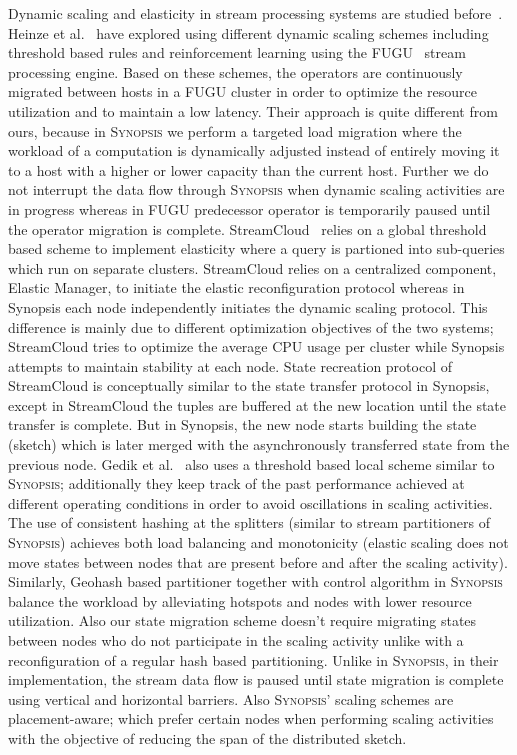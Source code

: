 Dynamic scaling and elasticity in stream processing systems are studied before~\cite{heinze2014auto, gulisano2012streamcloud, castro2013integrating, loesing2012stormy, heinze2013elastic, schneider2009elastic}.
Heinze et al.~\cite{heinze2014auto} have explored using different dynamic scaling schemes including threshold based rules and reinforcement learning using the FUGU~\cite{heinze2013elastic} stream processing engine.
Based on these schemes, the operators are continuously migrated between hosts in a FUGU cluster in order to optimize the resource utilization and to maintain a low latency.
Their approach is quite different from ours, because in \textsc{Synopsis} we perform a targeted load migration where the workload of a computation is dynamically adjusted instead of entirely moving it to a host with a higher or lower capacity than the current host.
Further we do not interrupt the data flow through \textsc{Synopsis} when dynamic scaling activities are in progress whereas in FUGU predecessor operator is temporarily paused until the operator migration is complete. 
StreamCloud~\cite{gulisano2012streamcloud} relies on a global threshold based scheme to implement elasticity where a query is partioned into sub-queries which run on separate clusters.
StreamCloud relies on a centralized component, Elastic Manager, to initiate the elastic reconfiguration protocol whereas in Synopsis each node independently initiates the dynamic scaling protocol.
This difference is mainly due to different optimization objectives of the two systems; StreamCloud tries to optimize the average CPU usage per cluster while Synopsis attempts to maintain stability at each node.
State recreation protocol of StreamCloud is conceptually similar to the state transfer protocol in Synopsis, except in StreamCloud the tuples are buffered at the new location until the state transfer is complete.
But in Synopsis, the new node starts building the state (sketch) which is later merged with the asynchronously transferred state from the previous node.
Gedik et al.~\cite{schneider2009elastic} also uses a threshold based local scheme similar to \textsc{Synopsis}; additionally they keep track of the past performance achieved at different operating conditions in order to avoid oscillations in scaling activities.
The use of consistent hashing at the splitters (similar to stream partitioners of \textsc{Synopsis}) achieves both load balancing and monotonicity (elastic scaling does not move states between nodes that are present before and after the scaling activity).
Similarly, Geohash based partitioner together with control algorithm in \textsc{Synopsis} balance the workload by alleviating hotspots and nodes with lower resource utilization.
Also our state migration scheme doesn't require migrating states between nodes who do not participate in the scaling activity unlike with a reconfiguration of a regular hash based partitioning.
Unlike in \textsc{Synopsis}, in their implementation, the stream data flow is paused until state migration is complete using vertical and horizontal barriers.
Also \textsc{Synopsis}' scaling schemes are placement-aware; which prefer certain nodes when performing scaling activities with the objective of reducing the span of the distributed sketch.

